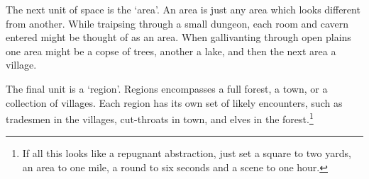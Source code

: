 \begin{multicols}{2}
The next unit of space is the `\gls{area}'.
An \gls{area} is just any \gls{area} which looks different from another.
While traipsing through a small dungeon, each room and cavern entered might be thought of as an \gls{area}.
When gallivanting through open plains one \gls{area} might be a copse of trees, another a lake, and then the next area a village.

The final unit is a `region'.
Regions encompasses a full forest, a town, or a collection of villages.
Each region has its own set of likely encounters, such as tradesmen in the villages, cut-throats in town, and elves in the forest.\footnote{If all this looks like a repugnant abstraction, just set a square to two yards, an area to one mile, a \gls{round} to six seconds and a scene to one hour.}

\end{multicols}


